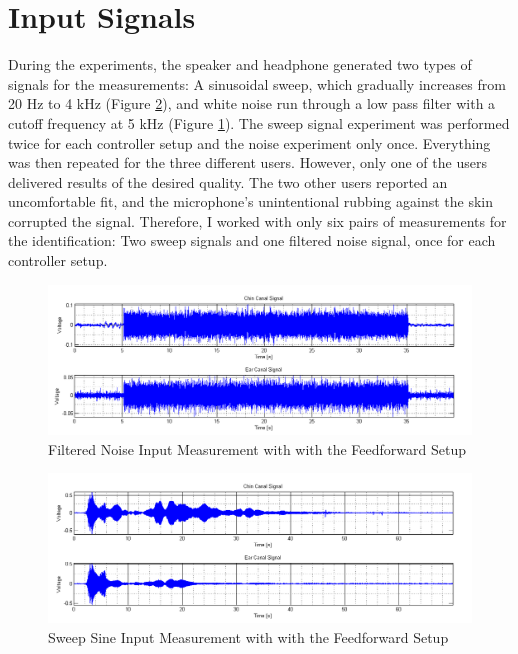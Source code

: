 \section{Input Signals}

During the experiments, the speaker and headphone generated two types of signals for the measurements: A sinusoidal sweep, which gradually increases from 20 Hz to 4 kHz (Figure \ref{fig:sweep}), and white noise run through a low pass filter with a cutoff frequency at 5 kHz (Figure \ref{fig:noise}). The sweep signal experiment was performed twice for each controller setup and the noise experiment only once. Everything was then repeated for the three different users. However, only one of the users delivered results of the desired quality. The two other users reported an uncomfortable fit, and the microphone's unintentional rubbing against the skin corrupted the signal. Therefore, I worked with only six pairs of measurements for the identification: Two sweep signals and one filtered noise signal, once for each controller setup.

\begin{figure}[h]
\centering
\includegraphics[width=1.0\textwidth]{pics/Noise}
\caption{Filtered Noise Input Measurement with with the Feedforward Setup}
\label{fig:noise}
\end{figure}

\begin{figure}[h]
\centering
\includegraphics[width=1.0\textwidth]{pics/Sweep}
\caption{Sweep Sine Input Measurement with with the Feedforward Setup}
\label{fig:sweep}
\end{figure}


